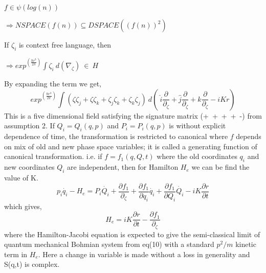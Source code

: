\documentclass{article}
\begin{document}
 \begin{center}
 \begin{math}
 f  \in \psi (log(n)) 
 \end{math}
\end{center}
\begin{center}
\begin{math}
 \Rightarrow NSPACE (f(n)) \subseteq DSPACE ((f(n))^2) 
 \end{math}
\end{center}
 If $\zeta_i$ is context free language, then
\begin{center}
\begin{math}
\Rightarrow exp^(\frac{\hbar r^{3}}{2\pi}) \int \zeta _{i}\ d(\nabla _{\zeta}) \ \in \ H  
\end{math}
\end{center}
By expanding the term we get,
\begin{equation}
 exp^(\frac{\hbar r^{3}}{2 \pi }) \int ( \zeta \zeta_{j}+\zeta \zeta_{k}+\zeta_{j}\zeta_{k}+\zeta_{k}\zeta_{j})\ d(\ \hat{i}\frac{\partial}{\partial_{\zeta}}+\hat{j}\frac{\partial}{\partial_{\zeta}}+\hat{k}\frac{\partial}{\partial_{\zeta}} - iKr)
\end{equation}
This is a five dimensional field satisfying the signature matrix (+\ +\ +\ +\ -) from assumption 2.\vspace{5mm} \newline
If $Q_{i} = Q_{i} (q,p)$ and $P_{i}= P_{i}(q,p) $ is without explicit dependence of time, the transformation is restricted to canonical where $f$ depends on mix of old and new phase space variables; it is called a generating function of canonical transformation. 
i.e. if $f = f_{1}(q,Q,t)$ where the old coordinates $q_{i}$ and new coordinates $Q_{i}$ are independent, then for Hamilton $H_{e}$ we can be find the value of K.
\begin{equation}
p_{i}\dot{q_{i}}- H_{e}=P_{i}\dot{Q_{i}}+\frac{\partial f_{1}}{\partial_{\zeta}}+\frac{\partial f_{1}}{\partial{q_{i}}}\dot {q_{i}}+\frac{\partial f_{1}}{\partial{Q_{i}}}\dot {Q_{i}}-iK\frac{\partial r}{\partial t}
\end{equation}
which gives,
\begin{equation}
    H_{e}=iK\frac{\partial r}{\partial t} - \frac{\partial f_{1}}{\partial_{\zeta}}
\end{equation}
where the Hamilton-Jacobi equation is expected to give the  semi-classical limit of quantum mechanical Bohmian system from eq(10) with a standard $p^{2}/m$ kinetic term in $H_{e}$. Here a change in variable is made without a loss in generality and S(q,t) is complex.
\end{document}
